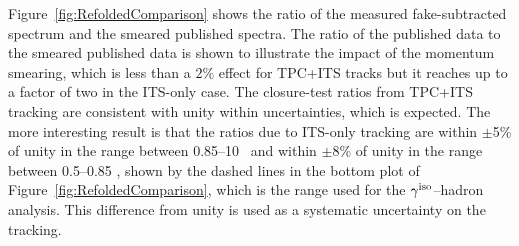 Figure~\ref{fig:RefoldedComparison} shows the ratio of the measured fake-subtracted spectrum and the smeared published spectra. The ratio of the published data to the smeared published data is shown to illustrate the impact of the momentum smearing, which is less than a $2\%$ effect for TPC+ITS tracks but it reaches up to a factor of two in the ITS-only case. The closure-test ratios from TPC+ITS tracking are consistent with unity within uncertainties, which is expected. The more interesting result is that the ratios due to ITS-only tracking are within $\pm$5\% of unity in the range between 0.85--10 \GeVc~and within $\pm$8\% of unity in the range between 0.5--0.85 \GeVc, shown by the dashed lines in the bottom plot of Figure~\ref{fig:RefoldedComparison}, which is the range used for the $\gamma^\mathrm{iso}$--hadron analysis. This difference from unity is used as a systematic uncertainty on the tracking.


